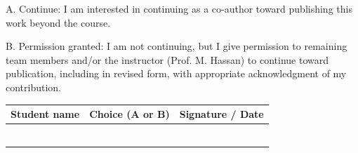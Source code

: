 \documentclass[11pt,a4paper]{article}
\begin{document}
A. Continue: I am interested in continuing as a co-author toward publishing this work beyond the course.

B. Permission granted: I am not continuing, but I give permission to remaining team members and/or the instructor (Prof. M. Hassan) to continue toward publication, including in revised form, with appropriate acknowledgment of my contribution.

\begin{center}
\begin{tabular}{|p{4.0cm}|p{3.0cm}|p{6.0cm}|}
\hline
\textbf{Student name} & \textbf{Choice (A or B)} & \textbf{Signature / Date}\\
\hline
[Name 1] & & \\
\hline
[Name 2] & & \\
\hline
[Name 3] & & \\
\hline
[Name 4] & & \\
\hline
[Name 5] & & \\
\hline
[Name 6] & & \\
\hline
\end{tabular}
\end{center}
\end{document}
